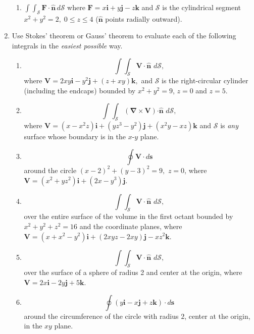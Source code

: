 \documentclass[fleqn]{article}
\begin{document}
\begin{enumerate}
\begin{enumerate}
        \item $\int \! \int_{\mathcal{S}}\mathbf{F\cdot \hat{n}\,}d\mathcal{S}$ where $\mathbf{F}=x\mathbf{i}+y\mathbf{j}-z\mathbf{k}$ and $\mathcal{S}$ is the cylindrical segment $x^{2}+y^{2}=2,\;0\leq z\leq 4$ ($\mathbf{\hat{n}}$ points radially outward).
      \end{enumerate}
    
    
    \item Use Stokes' theorem or Gauss' theorem to evaluate each of the following integrals in the \emph{easiest possible} way. 
      \begin{enumerate}
        \item
        \[
        \int \! \int_{\mathcal{S}}\mathbf{V\cdot \hat{n}}\,\,d\mathcal{S},
        \]
        where $\mathbf{V}=2xy\mathbf{i}-y^{2}\mathbf{j}+\left(
        z+xy\right) \mathbf{k},$ and $\mathcal{S}$ is the right-circular
        cylinder (including the endcaps) bounded by $x^{2}+y^{2}=9$, $z=0$ and
        $z=5$.
        
        \item
        \[
        \int \! \int_{\mathcal{S}}\left( \mathbf{\nabla \times V}\right)
        \mathbf{\cdot \hat{n}\,}\,d\mathcal{S},
        \]
        where $\mathbf{V}=\left( x-x^{2}z\right) \mathbf{i}+\left(
        yz^{3}-y^{2}\right) \mathbf{j}+\left( x^{2}y-xz\right) \mathbf{k} $ and $\mathcal{S}$ is \emph{any} surface whose boundary is in the $x$-$y$ plane.
        
        \item
        \[
        \oint \mathbf{V\cdot }d\mathbf{s}
        \]
        around the circle $\left( x-2\right) ^{2}+\left( y-3\right) ^{2}=9,$ $z=0$, where $\mathbf{V}=\left( x^{2}+yz^{2}\right) \mathbf{i}+\left(2x-y^{3}\right) \mathbf{j}$.
        
        \item
        \[
        \int \! \int_{\mathcal{S}}\mathbf{V\cdot \hat{n}}\,\,d\mathcal{S},
        \]
        over the entire surface of the volume in the first octant bounded by $
        x^{2}+y^{2}+z^{2}=16$ and the coordinate planes, where $\mathbf{V}=\left(x+x^{2}-y^{2}\right) \mathbf{i}+\left( 2xyz-2xy\right) \mathbf{j}-xz^{2}\mathbf{k}$.
        
        \item
        \[
        \int \! \int_{\mathcal{S}}\mathbf{V\cdot \hat{n}}\,\,d\mathcal{S},
        \]
        over the surface of a sphere of radius 2 and center at the origin, where $\mathbf{V}=2x\mathbf{i}-2y\mathbf{j}+5\mathbf{k}$.
        
        \item
        \[ \oint \left( y\mathbf{i}-x\mathbf{j}+z \mathbf{k}\right) \cdot d\mathbf{s}
        \]
        around the circumference of the circle with radius $2$, center at the
        origin, in the $xy$ plane.
      \end{enumerate}
    
    
    
    
    
    
  \end{enumerate}
\end{document}
